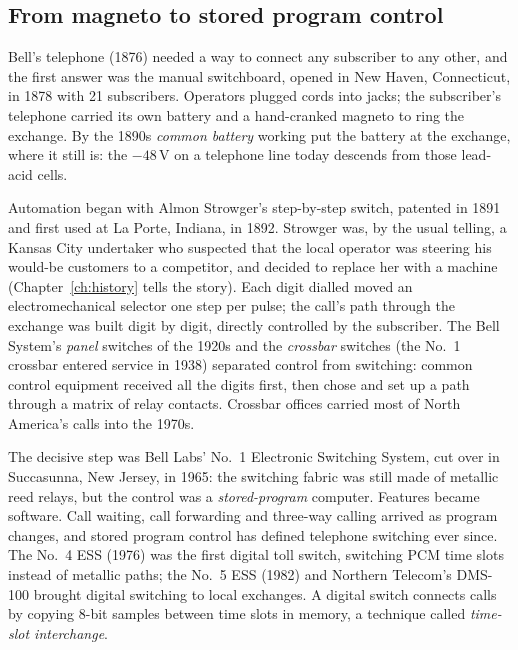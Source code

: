 \subsection{From magneto to stored program control}

\begin{history}
Bell's telephone (1876) needed a way to connect any subscriber to any other, and the first
answer was the manual switchboard, opened in New Haven, Connecticut, in 1878 with 21 subscribers.
Operators plugged cords into jacks; the subscriber's telephone carried its own battery
and a hand-cranked magneto to ring the exchange. By the 1890s \emph{common battery} working put the
battery at the exchange, where it still is: the $-48$\,V on a telephone line today descends from
those lead-acid cells.

Automation began with Almon Strowger's step-by-step switch, patented in 1891 and first used at La
Porte, Indiana, in 1892. Strowger was, by the usual telling, a Kansas City undertaker who suspected
that the local operator was steering his would-be customers to a competitor, and decided to
replace her with a machine (Chapter~\ref{ch:history} tells the story). Each digit dialled moved an
electromechanical selector one step per pulse; the call's path through the exchange was built digit
by digit, directly controlled by the subscriber. The Bell System's \emph{panel} switches of the
1920s and the \emph{crossbar} switches (the No.~1 crossbar entered service in 1938) separated
control from switching: common control equipment received all the digits first, then chose and set
up a path through a matrix of relay contacts. Crossbar offices carried most of North America's
calls into the 1970s.

The decisive step was Bell Labs' No.~1 Electronic Switching System, cut over in Succasunna, New
Jersey, in 1965: the switching fabric was still made of metallic reed relays, but the control was a
\emph{stored-program} computer. Features became software. Call waiting, call forwarding and
three-way calling arrived as program changes, and stored program control has defined telephone
switching ever since. The No.~4 ESS (1976) was the first digital toll switch, switching PCM time
slots instead of metallic paths; the No.~5 ESS (1982) and Northern Telecom's DMS-100 brought
digital switching to local exchanges. A digital switch connects calls by copying 8-bit samples
between time slots in memory, a technique called \emph{time-slot interchange}.
\end{history}





